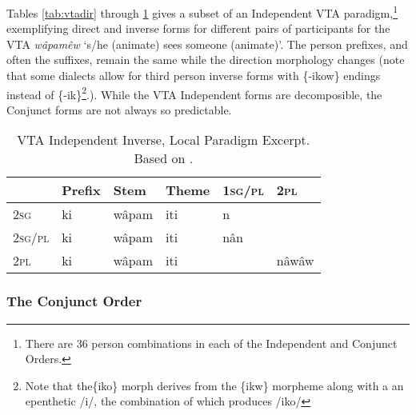Tables \ref{tab:vtadir} through \ref{tab:vtainvlocal} gives a subset of an Independent VTA paradigm,\footnote{There are 36 person combinations in each of the Independent and Conjunct Orders.} exemplifying direct and inverse forms for different pairs of participants for the VTA \textit{w\^{a}pam\^{e}w} `s/he (animate) sees someone (animate)'. The person prefixes, and often the suffixes, remain the same while the direction morphology changes (note that some dialects allow for third person inverse forms with \{-ikow\} endings instead of \{-ik\}\footnote{Note that the\{iko\} morph derives from the \{ikw\} morpheme along with a an epenthetic /i/, the combination of which produces /iko/}.). While the VTA Independent forms are decomposible, the Conjunct forms are not always so predictable.

\begin{table}[h]
\centering
\begin{tabular}{llllll}
    \toprule
        & Prefix & Stem  & Theme & 1\textsc{sg/pl} & 2\textsc{pl}  \\
    \midrule
2\textsc{sg}     & ki     & wâpam & iti   & n       &         \\
2\textsc{sg/pl} & ki     & wâpam & iti   & nân     &        \\
2\textsc{pl}     & ki     & wâpam & iti   &         & nâwâw  \\
    \bottomrule
  \end{tabular}
  \caption{
    VTA Independent Inverse, Local Paradigm Excerpt. Based on \citet[418]{Wolvengrey2011}. \label{tab:vtainvlocal}
  }
\end{table}

\FloatBarrier
\subsubsection{The Conjunct Order}

